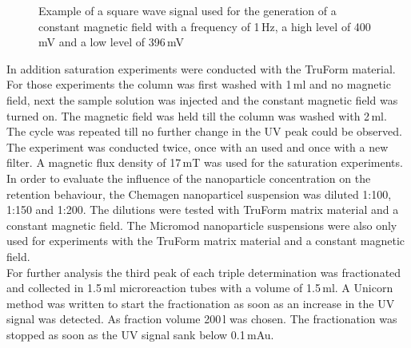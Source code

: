 \begin{figure}[h]
\centering

\caption[Example of a square wave signal]{Example of a square wave signal used for the generation of a constant magnetic field with a frequency of 1\,Hz, a high level of 400\,mV and a low level of 396\,mV
\label{fig:waveform}
}
\end{figure}


In addition saturation experiments were conducted with the TruForm material. For those experiments the column was first washed with 1\,ml and no magnetic field, next the sample solution was injected and the constant magnetic field was turned on. The magnetic field was held till the column was washed with 2\,ml. The cycle was repeated till no further change in the UV peak could be observed. The experiment was conducted twice, once with an used and once with a new filter. A magnetic flux density of 17\,mT was used for the saturation experiments.\\
In order to evaluate the influence of the nanoparticle concentration on the retention behaviour, the Chemagen nanoparticel suspension was diluted 1:100, 1:150 and 1:200. The dilutions were tested with TruForm matrix material and a constant magnetic field. The Micromod nanoparticle suspensions were also only used for experiments with the TruForm matrix material and a constant magnetic field.\\
For further analysis the third peak of each triple determination was fractionated and collected in 1.5\,ml microreaction tubes with a volume of 1.5\,ml. A Unicorn method was written to start the fractionation as soon as an increase in the UV signal was detected. As fraction volume 200\,\textmu l was chosen. The fractionation was stopped as soon as the UV signal sank below 0.1\,mAu. 
 

